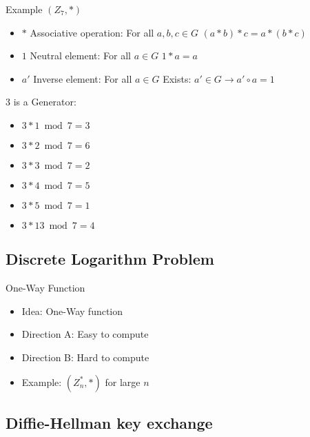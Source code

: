 \begin{example2}{Example $(Z_7,*)$}\\
    \begin{itemize}
        \item $*$ Associative operation: For all $a, b, c \in G$ $(a * b) * c = a * (b * c)$
        \item $1$ Neutral element: For all $a \in G$ $1 * a = a$
        \item $a'$ Inverse element: For all $a \in G$ Exists: $a' \in G \rightarrow a' \circ a = 1$
    \end{itemize}
    
    3 is a Generator:
    \begin{itemize}
        \item $3 * 1 \bmod 7 = 3$
        \item $3 * 2 \bmod 7 = 6$
        \item $3 * 3 \bmod 7 = 2$
        \item $3 * 4 \bmod 7 = 5$
        \item $3 * 5 \bmod 7 = 1$
        \item $3 * 13 \bmod 7 = 4$
    \end{itemize}
\end{example2}

\subsection{Discrete Logarithm Problem}

\begin{concept}{One-Way Function}\\
    \begin{itemize}
        \item Idea: One-Way function
        \item Direction A: Easy to compute
        \item Direction B: Hard to compute
        \item Example: $(Z_n^*, *)$ for large $n$
    \end{itemize}
\end{concept}

\subsection{Diffie-Hellman key exchange}

